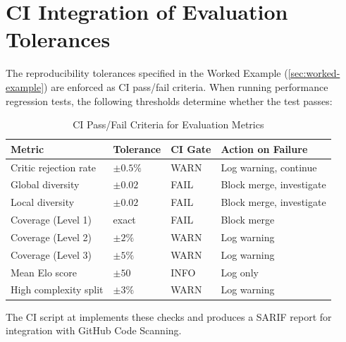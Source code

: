 \section{CI Integration of Evaluation Tolerances}
\label{sec:ci-tolerances}

The reproducibility tolerances specified in the Worked Example 
(\cref{sec:worked-example}) are enforced as CI pass/fail criteria.
When running performance regression tests, the following thresholds
determine whether the test passes:

\begin{table}[H]
\centering
\caption{CI Pass/Fail Criteria for Evaluation Metrics}
\label{tab:ci-pass-fail}
\begin{tabularx}{\textwidth}{lllX}
\toprule
\textbf{Metric} & \textbf{Tolerance} & \textbf{CI Gate} & \textbf{Action on Failure} \\
\midrule
Critic rejection rate & $\pm 0.5\%$ & WARN & Log warning, continue \\
Global diversity & $\pm 0.02$ & FAIL & Block merge, investigate \\
Local diversity & $\pm 0.02$ & FAIL & Block merge, investigate \\
Coverage (Level 1) & exact & FAIL & Block merge \\
Coverage (Level 2) & $\pm 2\%$ & WARN & Log warning \\
Coverage (Level 3) & $\pm 5\%$ & WARN & Log warning \\
Mean Elo score & $\pm 50$ & INFO & Log only \\
High complexity split & $\pm 3\%$ & WARN & Log warning \\
\bottomrule
\end{tabularx}
\end{table}

\noindent
The CI script at  implements
these checks and produces a SARIF report for integration with GitHub
Code Scanning.
